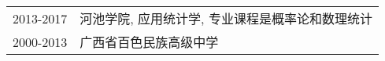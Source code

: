 \begin{tabular}{ll}
  2013-2017 & 河池学院, 应用统计学, 专业课程是概率论和数理统计 \\
  2000-2013 & 广西省百色民族高级中学 \\
\end{tabular}
